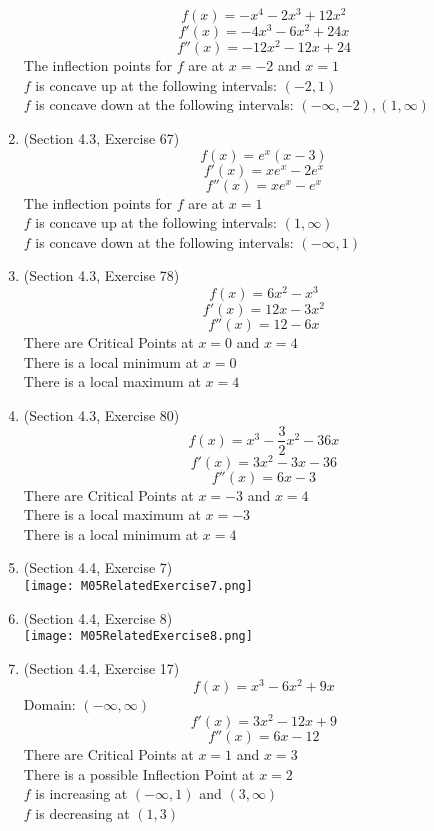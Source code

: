 \documentclass{article}
\begin{document}
\begin{enumerate}
        $$f(x) = -x^4 - 2x^3 + 12x^2$$
        $$f'(x) = -4x^3 - 6x^2 + 24x$$
        $$f''(x) = -12x^2 - 12x + 24$$
        The inflection points for $f$ are at $x = -2$ and $x = 1$ \\
        $f$ is concave up at the following intervals: $(-2, 1)$ \\
        $f$ is concave down at the following intervals: $(-\infty, -2), (1, \infty)$
    \item (Section 4.3, Exercise 67)
        $$f(x) = e^x\left(x - 3\right)$$
        $$f'(x) = xe^x - 2e^x$$
        $$f''(x) = xe^x - e^x$$
        The inflection points for $f$ are at $x = 1$ \\
        $f$ is concave up at the following intervals: $(1, \infty)$ \\
        $f$ is concave down at the following intervals: $(-\infty, 1)$
    \item (Section 4.3, Exercise 78)
        $$f(x) = 6x^2 - x^3$$
        $$f'(x) = 12x - 3x^2$$
        $$f''(x) = 12 - 6x$$
        There are Critical Points at $x = 0$ and $x = 4$ \\
        There is a local minimum at $x = 0$ \\
        There is a local maximum at $x = 4$
    \item (Section 4.3, Exercise 80)
        $$f(x) = x^3 - \frac{3}{2}x^2 - 36x$$
        $$f'(x) = 3x^2 - 3x - 36$$
        $$f''(x) = 6x - 3$$
        There are Critical Points at $x = -3$ and $x = 4$ \\
        There is a local maximum at $x = -3$ \\
        There is a local minimum at $x = 4$
    \item (Section 4.4, Exercise 7) \\
        \texttt{[image: M05RelatedExercise7.png]}
    \item (Section 4.4, Exercise 8) \\
        \texttt{[image: M05RelatedExercise8.png]}
    \item (Section 4.4, Exercise 17)
        $$f(x) = x^3 - 6x^2 + 9x$$
        Domain: $(-\infty, \infty)$
        $$f'(x) = 3x^2 - 12x + 9$$
        $$f''(x) = 6x - 12$$
        There are Critical Points at $x = 1$ and $x = 3$ \\
        There is a possible Inflection Point at $x = 2$ \\
        $f$ is increasing at $(-\infty, 1)$ and $(3, \infty)$ \\
        $f$ is decreasing at $(1, 3)$ \\

\end{enumerate}
\end{document}
